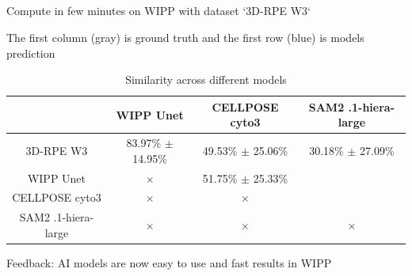 \subsection{\slidetitle}
\begin{frame}
  \frametitle{\sectiontitle}
  \framesubtitle{\slidetitle}

  Compute in few minutes on WIPP with dataset `3D-RPE W3`

  The first column (gray) is ground truth and the first row (blue) is models prediction

  \begin{center}
    \begin{table}
      \begin{tabular}{|c|c|c|c|}
       \hline
       \rowcolor{tableFirstRowColor}                      & WIPP Unet             & CELLPOSE cyto3        & SAM2 .1-hiera-large   \\ [0.5ex]
       \hline
       \cellcolor{tableFirstColColor} 3D-RPE W3           & 83.97\% $\pm$ 14.95\% & 49.53\% $\pm$ 25.06\% & 30.18\% $\pm$ 27.09\% \\
       \hline
       \cellcolor{tableFirstColColor} WIPP Unet           & $\times$              & 51.75\% $\pm$ 25.33\% & \\
       \hline
       \cellcolor{tableFirstColColor} CELLPOSE cyto3      & $\times$              & $\times$              & \\
       \hline
       \cellcolor{tableFirstColColor} SAM2 .1-hiera-large & $\times$              & $\times$              & $\times$              \\
       \hline
      \end{tabular}
      \caption{Similarity across different models}
    \end{table}
  \end{center}

  Feedback: AI models are now easy to use and fast results in WIPP

\end{frame}
